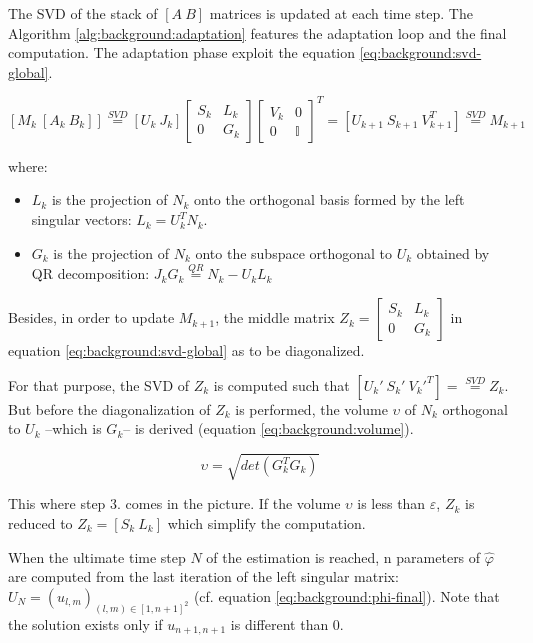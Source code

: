 \documentclass[/home/francois/latex/report/main.tex]{subfiles}
\begin{document}
The \ac{SVD} of the stack of $[A \ B]$ matrices is updated at each time step. The Algorithm \ref{alg:background:adaptation} features the adaptation loop and the final computation. The adaptation phase exploit the equation \ref{eq:background:svd-global}.

\begin{equation}
  \label{eq:background:svd-global}
  [M_k \ [A_k \ B_k]] \overset{SVD}{=} [U_k \ J_k]
  \begin{bmatrix}
  S_k &  L_k \\
  0 & G_k
\end{bmatrix}
  \begin{bmatrix}
  V_k &  0 \\
  0 & \mathbb{I}
\end{bmatrix}^T = [U_{k+1} \ S_{k+1} \ V_{k+1}^T]
 \overset{SVD}{=} M_{k+1}
\end{equation}

where:
\begin{itemize}
  \item $L_k$ is the projection of $N_k$ onto the orthogonal basis formed by the left singular vectors: $L_k = U_k^T N_k$.
  \item $G_k$ is the projection of $N_k$ onto the subspace orthogonal to $U_k$ obtained by QR decomposition: $J_k G_k \overset{QR}{=} N_k - U_k L_k$
\end{itemize}

Besides, in order to update $M_{k+1}$, the middle matrix $Z_k=
\begin{bmatrix}
  S_k &  L_k \\
  0 & G_k
\end{bmatrix}$
in equation \ref{eq:background:svd-global} as to be diagonalized.

For that purpose, the \ac{SVD} of $Z_k$ is computed such that $[U_{k}' \ S_{k}' \ V_{k}'^T] = \overset{SVD}{=} Z_k$. But before the diagonalization of $Z_k$ is performed, the volume $\upsilon$ of $N_k$ orthogonal to $U_k$ –which is $G_k$– is derived (equation \ref{eq:background:volume}).

\begin{equation}
  \label{eq:background:volume}
  \upsilon = \sqrt{det(G_k^T G_k)}
\end{equation}

This where step 3. comes in the picture. If the volume $\upsilon$ is less than $\varepsilon$, $Z_k$ is reduced to $Z_k = [S_k \ L_k]$ which simplify the computation.

When the ultimate time step $N$ of the estimation is reached, n parameters of $\hat{\varphi}$ are computed from the last iteration of the left singular matrix: $U_{N} = (u_{l,m})_{(l, m) \in [1,n+1]^2}$ (cf. equation \ref{eq:background:phi-final}). Note that the solution exists only if $u_{n+1, n+1}$ is different than 0.
\end{document}
